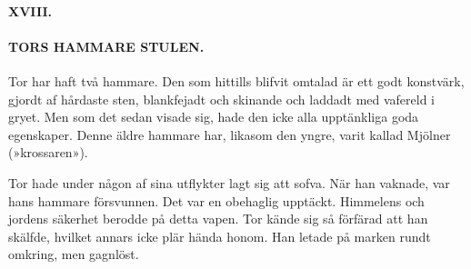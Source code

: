 \paragraph{XVIII.}

\paragraph{TORS HAMMARE STULEN.}

Tor har haft två hammare. Den som hittills blifvit omtalad är ett godt
konstvärk, gjordt af hårdaste sten, blankfejadt och skinande och laddadt
med vafereld i gryet. Men som det sedan visade sig, hade den icke alla
upptänkliga goda egenskaper. Denne äldre hammare har, likasom den yngre,
varit kallad Mjölner (»krossaren»).

Tor hade under någon af sina utflykter lagt sig att sofva. När han
vaknade, var hans hammare försvunnen. Det var en obehaglig upptäckt.
Himmelens och jordens säkerhet berodde på detta vapen. Tor kände sig så
förfärad att han skälfde, hvilket annars icke plär hända honom. Han
letade på marken rundt omkring, men gagnlöst.

